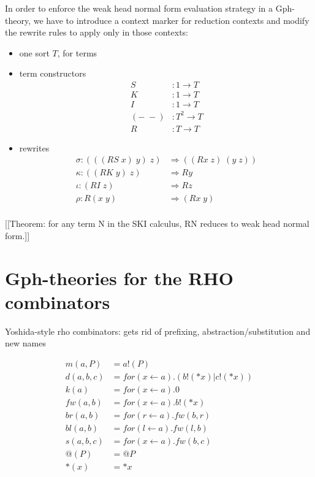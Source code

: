 \documentclass{llncs}
\begin{document}
In order to enforce the weak head normal form evaluation strategy in a Gph-theory, we have to introduce a context marker for reduction contexts and modify the rewrite rules to apply only in those contexts:
\begin{itemize}
  \item one sort $T$, for terms
  \item term constructors
  \[\begin{array}{rl}
    S&:1 \to T\\
    K&:1 \to T\\
    I&:1 \to T\\
    (-\; -)&: T^2 \to T\\
    R&:T \to T
  \end{array}\]
  \item rewrites
  \[\begin{array}{rl}
    \sigma:(((RS\; x)\; y)\; z) &\Rightarrow ((Rx\; z)\; (y\; z))\\
    \kappa:((RK\; y)\; z) &\Rightarrow Ry\\
    \iota:(RI\; z) &\Rightarrow Rz\\
    \rho:R(x\;y) &\Rightarrow (Rx\;y)\\
  \end{array}\]
\end{itemize}
[[Theorem: for any term N in the SKI calculus, RN reduces to weak head normal form.]]

\section{Gph-theories for the RHO combinators}
Yoshida-style rho combinators: gets rid of prefixing,
abstraction/substitution and new names

\[\begin{array}{rl}
  m(a,P) &= a!(P) \\
  d(a,b,c) &= for(x \leftarrow a).(b!(*x) | c!(*x)) \\
  k(a) &= for(x \leftarrow a).0 \\ 
  fw(a,b) &= for(x \leftarrow a).b!(*x) \\
  br(a,b) &= for(r \leftarrow a).fw(b,r) \\
  bl(a,b) &= for(l \leftarrow a).fw(l,b) \\
  s(a,b,c) &= for(x \leftarrow a).fw(b,c) \\
  @(P) &= @P \\
  *(x) &= *x \\  
\end{array}\]
\end{document}
